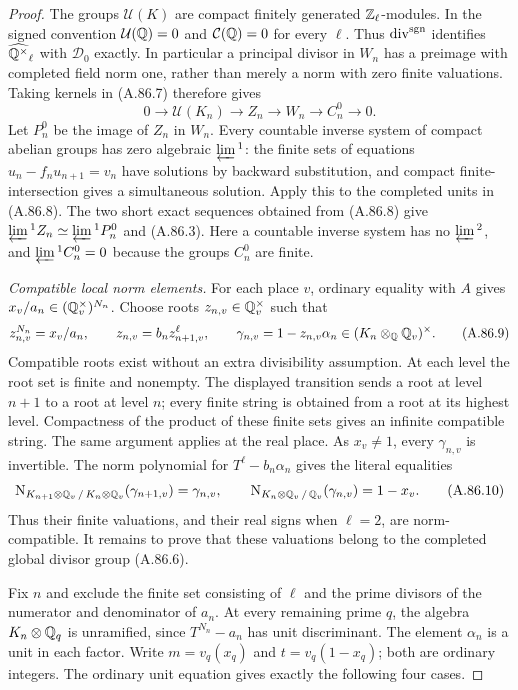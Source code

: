 \begin{proof}
The groups $\mathcal U(K)$ are compact finitely generated
$\mathbb Z_\ell$-modules.  In the signed convention
$\mathcal U(\mathbb Q)=0$ and $\mathcal C(\mathbb Q)=0$ for every $\ell$.
Thus $\operatorname{div}^{\rm sgn}$ identifies
$\widehat{\mathbb Q^\times}_\ell$ with $\mathcal D_0$ exactly.
In particular a principal divisor in $W_n$ has a preimage with
completed field norm one, rather than merely a norm with zero
finite valuations.  Taking kernels in (A.86.7) therefore gives
\[
 0\longrightarrow\mathcal U(K_n)\longrightarrow Z_n
       \longrightarrow W_n\longrightarrow C_n^0\longrightarrow0.
 \tag{A.86.8}
\]
Let $P_n^0$ be the image of $Z_n$ in $W_n$.
Every countable inverse system of compact abelian groups has
zero algebraic $\varprojlim{}^1$: the finite sets of equations
$u_n-f_nu_{n+1}=v_n$ have solutions by backward substitution,
and compact finite-intersection gives a simultaneous solution.
Apply this to the completed units in (A.86.8).  The two short
exact sequences obtained from (A.86.8) give
$\varprojlim{}^1Z_n\simeq\varprojlim{}^1P_n^0$ and (A.86.3).
Here a countable inverse system has no $\varprojlim{}^2$, and
$\varprojlim{}^1 C_n^0=0$ because the groups $C_n^0$ are finite.

\emph{Compatible local norm elements.}
For each place $v$, ordinary equality with $A$ gives
$x_v/a_n\in(\mathbb Q_v^\times)^{N_n}$.
Choose roots $z_{n,v}\in\mathbb Q_v^\times$ such that
\[
 z_{n,v}^{N_n}=x_v/a_n,\qquad
 z_{n,v}=b_nz_{n+1,v}^{\ell},\qquad
 \gamma_{n,v}=1-z_{n,v}\alpha_n
                         \in(K_n\otimes_\mathbb Q\mathbb Q_v)^\times.
 \tag{A.86.9}
\]
Compatible roots exist without an extra divisibility assumption.
At each level the root set is finite and nonempty.  The displayed
transition sends a root at level $n+1$ to a root at level $n$;
every finite string is obtained from a root at its highest level.
Compactness of the product of these finite sets gives an infinite
compatible string.  The same argument applies at the real place.
As $x_v\ne1$, every $\gamma_{n,v}$ is invertible.  The norm
polynomial for $T^\ell-b_n\alpha_n$ gives the literal equalities
\[
 \mathrm N_{K_{n+1}\otimes\mathbb Q_v\,/\,K_n\otimes\mathbb Q_v}
                               (\gamma_{n+1,v})=\gamma_{n,v},
 \qquad
 \mathrm N_{K_n\otimes\mathbb Q_v\,/\,\mathbb Q_v}(\gamma_{n,v})=1-x_v.
 \tag{A.86.10}
\]
Thus their finite valuations, and their real signs when $\ell=2$,
are norm-compatible.  It remains to prove that these valuations
belong to the completed global divisor group (A.86.6).

Fix $n$ and exclude the finite set consisting of $\ell$ and the
prime divisors of the numerator and denominator of $a_n$.
At every remaining prime $q$, the algebra $K_n\otimes\mathbb Q_q$ is
unramified, since $T^{N_n}-a_n$ has unit discriminant.
The element $\alpha_n$ is a unit in each factor.
Write $m=v_q(x_q)$ and $t=v_q(1-x_q)$; both are ordinary integers.
The ordinary unit equation gives exactly the following four cases.


\end{proof}
